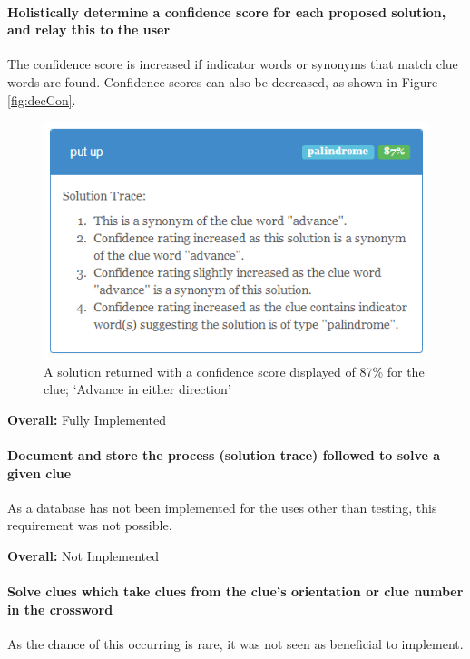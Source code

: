\paragraph{Holistically determine a confidence score for each proposed
solution, and relay this to the user}

The confidence score is increased if indicator words or synonyms that match clue
words are found. Confidence scores can also be decreased, as shown in Figure
\ref{fig:decCon}.

\begin{figure}[H]
	\centering
	\includegraphics[scale=0.8]{evidence/confidence.png}
	\caption{A solution returned with a confidence score displayed of 87\% for the
	clue; `Advance in either direction'}
\end{figure}

{\bf Overall:} Fully Implemented


\paragraph{Document and store the process (solution trace) followed to solve a
given clue}

As a database has not been implemented for the uses other than testing, this
requirement was not possible.

{\bf Overall:} Not Implemented


\paragraph{Solve clues which take clues from the clue's orientation or clue
number in the crossword}

As the chance of this occurring is rare, it was not seen as beneficial to
implement.

